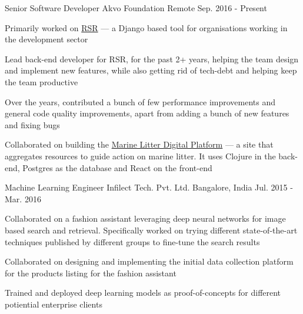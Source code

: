 

\begin{cventries}

  \cventry
      {Senior Software Developer} %
      {Akvo Foundation } %
      {Remote} %
      {Sep. 2016 - Present} %
      {
        \begin{cvitems} %
        \item {Primarily worked on \href{https://github.com/akvo/akvo-rsr}{RSR} --- a Django based tool for organisations working in the development sector}
        \item {Lead back-end developer for RSR, for the past 2+ years, helping the team design and implement new features, while also getting rid of tech-debt and helping keep the team productive}
        \item {Over the years, contributed a bunch of few performance improvements and general code quality improvements, apart from adding a bunch of new features and fixing bugs}
        \item {Collaborated on building the \href{https://digital.gpmarinelitter.org/}{Marine Litter Digital Platform} --- a site that aggregates resources to guide action on marine litter. It uses Clojure in the back-end, Postgres as the database and React on the front-end}
        \end{cvitems}
      }

  \cventry
    {Machine Learning Engineer} %
    {Infilect Tech. Pvt. Ltd. } %
    {Bangalore, India} %
    {Jul. 2015 - Mar. 2016} %
    {
      \begin{cvitems} %
      \item{Collaborated on a fashion assistant leveraging deep neural networks for image based search and retrieval. Specifically worked on trying different state-of-the-art techniques published by different groups to fine-tune the search results}
        \item{Collaborated on designing and implementing the initial data collection platform for the products listing for the fashion assistant}
        \item{Trained and deployed deep learning models as proof-of-concepts for different potiential enterprise clients}
      \end{cvitems}
    }


\end{cventries}
